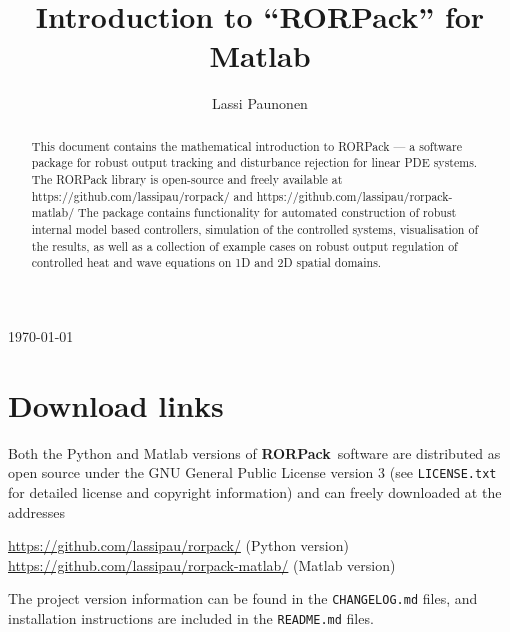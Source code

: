 \documentclass[11pt, a4paper]{amsart}
\theoremstyle{definition}
\numberwithin{equation}{section}
\newcommand{\RORname}{\textbf{RORPack}}
\newcommand{\RORnameplain}{RORPack}
\newcommand{\shorten}[1]{{\color{gray}#1}}
\renewcommand{\shorten}[1]{}
\begin{document}
\title[Introduction to ``\RORnameplain'']{Introduction to ``\RORname'' for Matlab\\[1ex]\footnotesize{}}
\thispagestyle{plain}

\author{Lassi Paunonen}
\address{Department of Mathematics, Tampere University, PO.\ Box 692, 33101 Tampere, Finland}


\maketitle

\vspace{-3ex}

\begin{center}
  \today
\end{center}

\vspace{3ex}

\begin{abstract}
  This document contains the mathematical introduction to RORPack --- a software package for robust output tracking and disturbance rejection for linear PDE systems. The RORPack library is open-source and freely available at 
https://github.com/lassipau/rorpack/ and
https://github.com/lassipau/rorpack-matlab/
The package contains functionality for automated construction of robust internal model based controllers, simulation of the controlled systems, visualisation of the results, as well as a collection of example cases on robust output regulation of controlled heat and wave equations on 1D and 2D spatial domains.
\end{abstract}

{\small\tableofcontents}


\section*{Download links}


Both the Python and Matlab versions of \RORname\ software are distributed as open source under the GNU General Public License version 3 (see \texttt{LICENSE.txt} for detailed license and copyright information) and can freely downloaded at the addresses
\begin{flushleft}
 \hspace{1.6cm} \href{https://github.com/lassipau/rorpack/}{https://github.com/lassipau/rorpack/} \hspace{1.4cm} (Python version)\\
 \hspace{1.6cm}  \href{https://github.com/lassipau/rorpack-matlab/}{https://github.com/lassipau/rorpack-matlab/} \hspace{.1cm} (Matlab version)
\end{flushleft}
The project version information can be found in the \texttt{CHANGELOG.md} files, and installation instructions are included in the \texttt{README.md} files.
\end{document}
